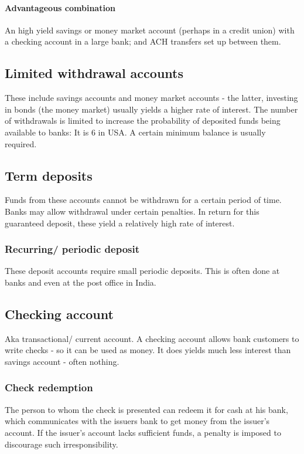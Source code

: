 \documentclass[oneside, article]{memoir}
\begin{document}
\paragraph{Advantageous combination}
An high yield savings or money market account (perhaps in a credit union) with a checking account in a large bank; and ACH transfers set up between them.

\subsection{Limited withdrawal accounts}
These include savings accounts and money market accounts - the latter, investing in bonds (the money market) usually yields a higher rate of interest. The number of withdrawals is limited to increase the probability of deposited funds being available to banks: It is 6 in USA. A certain minimum balance is usually required.

\subsection{Term deposits}
Funds from these accounts cannot be withdrawn for a certain period of time. Banks may allow withdrawal under certain penalties. In return for this guaranteed  deposit, these yield a relatively high rate of interest.

\subsubsection{Recurring/ periodic deposit}
These deposit accounts require small periodic deposits. This is often done at banks and even at the post office in India.

\subsection{Checking account}
Aka transactional/ current account. A checking account allows bank customers to write checks - so it can be used as money. It does yields much less interest than savings account - often nothing.

\subsubsection{Check redemption}
The person to whom the check is presented can redeem it for cash at his bank, which communicates with the issuers bank to get money from the issuer's account. If the issuer's account lacks sufficient funds, a penalty is imposed to discourage such irresponsibility.
\end{document}
